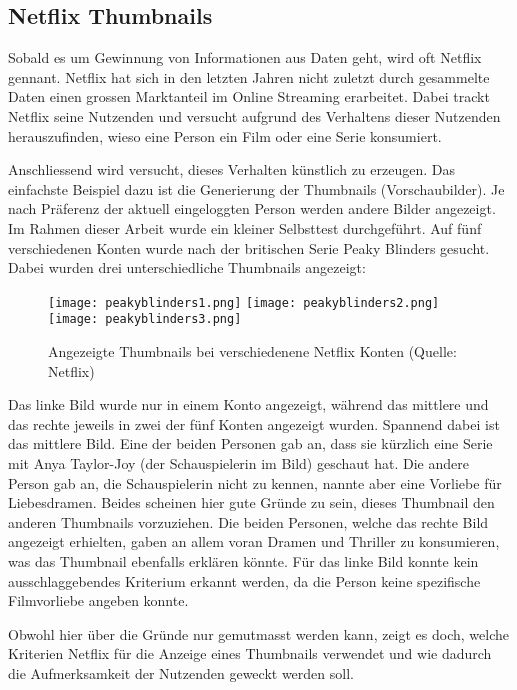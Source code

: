 \subsection{Netflix Thumbnails}
Sobald es um Gewinnung von Informationen aus Daten geht, wird oft Netflix gennant. Netflix hat sich in den letzten Jahren nicht zuletzt durch gesammelte Daten einen grossen Marktanteil im Online Streaming erarbeitet.
Dabei trackt Netflix seine Nutzenden und versucht aufgrund des Verhaltens dieser Nutzenden herauszufinden, wieso eine Person ein Film oder eine Serie konsumiert.\cite{netflix}

Anschliessend wird versucht, dieses Verhalten künstlich zu erzeugen. Das einfachste Beispiel dazu ist die Generierung der Thumbnails (Vorschaubilder). Je nach Präferenz der aktuell eingeloggten Person werden andere Bilder angezeigt. Im Rahmen dieser Arbeit wurde ein kleiner Selbsttest durchgeführt. Auf fünf verschiedenen Konten wurde nach der britischen Serie Peaky Blinders gesucht. Dabei wurden drei unterschiedliche Thumbnails angezeigt:
\begin{figure*}[ht!]
	\texttt{[image: peakyblinders1.png]}\hfill
	\texttt{[image: peakyblinders2.png]}\hfill
	\texttt{[image: peakyblinders3.png]}
	\caption{Angezeigte Thumbnails bei verschiedenene Netflix Konten (Quelle: Netflix)}
\end{figure*}

Das linke Bild wurde nur in einem Konto angezeigt, während das mittlere und das rechte jeweils in zwei der fünf Konten angezeigt wurden.
Spannend dabei ist das mittlere Bild. Eine der beiden Personen gab an, dass sie kürzlich eine Serie mit Anya Taylor-Joy (der Schauspielerin im Bild) geschaut hat. Die andere Person gab an, die Schauspielerin nicht zu kennen, nannte aber eine Vorliebe für Liebesdramen. Beides scheinen hier gute Gründe zu sein, dieses Thumbnail den anderen Thumbnails vorzuziehen. Die beiden Personen, welche das rechte Bild angezeigt erhielten, gaben an allem voran Dramen und Thriller zu konsumieren, was das Thumbnail ebenfalls erklären könnte. Für das linke Bild konnte kein ausschlaggebendes Kriterium erkannt werden, da die Person keine spezifische Filmvorliebe angeben konnte.

Obwohl hier über die Gründe nur gemutmasst werden kann, zeigt es doch, welche Kriterien Netflix für die Anzeige eines Thumbnails verwendet und wie dadurch die Aufmerksamkeit der Nutzenden geweckt werden soll.

